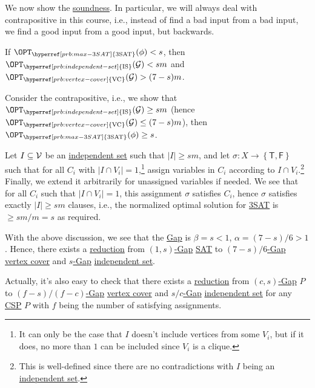 We now show the \hyperref[def:soundness]{soundness}. In particular, we will always deal with contrapositive in this course, i.e., instead of find a bad input from a bad input, we find a good input from a good input, but backwards.

\begin{claim}
	If	\(\OPT_{\hyperref[prb:max-3SAT]{\text{3SAT}}} (\phi) < s\), then \(\OPT_{\hyperref[prb:independent-set]{\text{IS}} }(\mathcal{\MakeUppercase{g}} ) < sm\) and \(\OPT_{\hyperref[prb:vertex-cover]{\text{VC}} }(\mathcal{\MakeUppercase{g}} ) > (7-s)m\).
\end{claim}
\begin{explanation}
	Consider the contrapositive, i.e., we show that \(\OPT_{\hyperref[prb:independent-set]{\text{IS}} }(\mathcal{\MakeUppercase{g}} ) \geq sm\) (hence \(\OPT_{\hyperref[prb:vertex-cover]{\text{VC}} }(\mathcal{\MakeUppercase{g}} ) \leq (7-s)m\)), then \(\OPT_{\hyperref[prb:max-3SAT]{\text{3SAT}} }(\phi) \geq s\).

	Let \(I \subseteq \mathcal{\MakeUppercase{v}} \) be an \hyperref[def:independent-set]{independent set} such that \(\vert I \vert \geq sm\), and let \(\sigma \colon X \to \left\{ \textsf{T}, \textsf{F} \right\} \) such that for all \(C_i\) with \(\vert I \cap V_i \vert = 1\),\footnote{It can only be the case that \(I\) doesn't include vertices from some \(V_i\), but if it does, no more than \(1\) can be included since \(V_i\) is a clique.} assign variables in \(C_i\) according to \(I \cap V_i\).\footnote{This is well-defined since there are no contradictions with \(I\) being an \hyperref[def:independent-set]{independent set}.} Finally, we extend it arbitrarily for unassigned variables if needed. We see that for all \(C_i\) such that \(\vert I \cap  V_i \vert = 1\), this assignment \(\sigma \) satisfies \(C_i\), hence \(\sigma \) satisfies exactly \(\vert I \vert \geq sm\) clauses, i.e., the normalized optimal solution for \hyperref[prb:max-3SAT]{3SAT} is \(\geq sm/m = s\) as required.
\end{explanation}

With the above discussion, we see that the \hyperref[def:Gap]{Gap} is \(\beta = s < 1\), \(\alpha = (7-s) / 6 > 1\). Hence, there exists a \hyperref[def:reduction]{reduction} from \hyperref[def:c-s-Gap]{\((1, s)\)-Gap} \hyperref[prb:max-3SAT]{SAT} to \hyperref[def:Gap]{\((7 - s) / 6\)-Gap} \hyperref[prb:vertex-cover]{vertex cover} and \hyperref[def:Gap]{\(s\)-Gap} \hyperref[prb:independent-set]{independent set}.

\begin{remark}
	Actually, it's also easy to check that there exists a \hyperref[def:reduction]{reduction} from \hyperref[def:c-s-Gap]{\((c, s)\)-Gap} \(P\) to \hyperref[def:Gap]{\((f-s) / (f-c)\)-Gap} \hyperref[prb:vertex-cover]{vertex cover} and \hyperref[def:Gap]{\(s / c\)-Gap} \hyperref[def:independent-set]{independent set} for any \hyperref[prb:CSP]{CSP} \(P\) with \(f\) being the number of satisfying assignments.
\end{remark}

